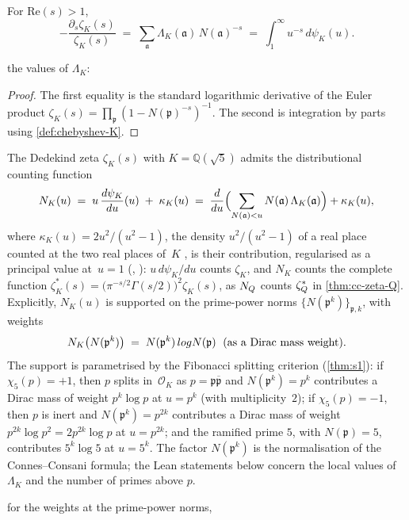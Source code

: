 \begin{proposition}\label{prop:dlog-zetaK}
For $\mathrm{Re}(s)>1$,
\begin{equation}\label{eq:dlog-zetaK}
  -\frac{\partial_s\zeta_K(s)}{\zeta_K(s)}
  \;=\; \sum_{\mathfrak{a}}\Lambda_K(\mathfrak{a})\,N(\mathfrak{a})^{-s}
  \;=\; \int_1^\infty u^{-s}\,d\psi_K(u).
\end{equation}
\end{proposition}
the values of $\Lambda_K$:


\begin{proof}
The first equality is the standard logarithmic derivative of the
Euler product $\zeta_K(s) = \prod_\mathfrak{p}(1-N(\mathfrak{p})^{-s})^{-1}$.
The second is integration by parts using
\cref{def:chebyshev-K}.
\end{proof}

\begin{theorem}\label{thm:pcf-counting}
The Dedekind zeta $\zeta_K(s)$ with $K=\mathbb{Q}(\sqrt{5})$
admits the distributional counting function
\begin{equation}\label{eq:N-K}
  N_K(u) \;=\; u\,\frac{d\psi_K}{du}(u)\;+\;\kappa_K(u)
  \;=\;\frac{d}{du}\Bigl(\sum_{N(\mathfrak a)<u}N(\mathfrak a)\,\Lambda_K(\mathfrak a)\Bigr)+\kappa_K(u),
\end{equation}
where $\kappa_K(u)=2u^2/(u^2-1)$, the density $u^2/(u^2-1)$ of a real place counted at the two real places
of~$K$ \cite[Appendix, `Arithmetic machinery']{gonzalez26cw}, is their contribution, regularised as a principal value at~$u=1$
(, ): $u\,d\psi_K/du$ counts $\zeta_K$, and $N_K$ counts the complete
function $\zeta_K^*(s)=\bigl(\pi^{-s/2}\Gamma(s/2)\bigr)^2\zeta_K(s)$, as $N_\Q$ counts $\zeta_\Q^*$ in
\cref{thm:cc-zeta-Q}.  Explicitly,
$N_K(u)$ is supported on the prime-power norms
$\{N(\mathfrak{p}^k)\}_{\mathfrak{p},k}$, with weights
\begin{equation}\label{eq:N-K-weights}
  N_K\big(N(\mathfrak{p}^k)\big)
  \;=\; N(\mathfrak{p}^k)\,\log N(\mathfrak{p})
  \;\text{ \textup{(}as a Dirac mass weight\textup{)}}.
\end{equation}
The support is parametrised by the Fibonacci splitting criterion
\textup{(\cref{thm:s1})}: if $\chi_5(p) = +1$, then $p$
splits in~$\mathcal{O}_K$ as $p = \mathfrak{p}\overline{\mathfrak{p}}$ and
$N(\mathfrak{p}^k) = p^k$ contributes a Dirac mass of weight
$p^k\log p$ at $u = p^k$ \textup{(}with multiplicity~$2$\textup{)};
if $\chi_5(p) = -1$, then $p$ is inert and $N(\mathfrak{p}^k) = p^{2k}$
contributes a Dirac mass of weight $p^{2k}\log p^2 = 2p^{2k}\log p$ at $u = p^{2k}$;
and the ramified prime $5$, with $N(\mathfrak p)=5$, contributes $5^k\log5$ at $u=5^k$.
The factor $N(\mathfrak p^k)$ is the normalisation of the Connes--Consani formula;
the Lean statements below concern the local values of $\Lambda_K$ and the number of
primes above $p$.
\end{theorem}
for the weights at the prime-power norms,

